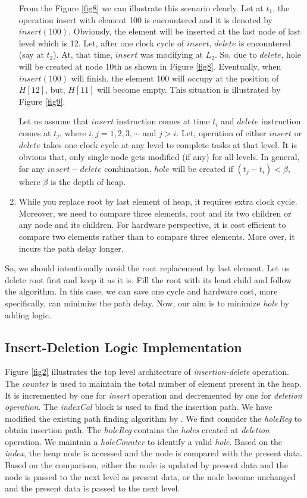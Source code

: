 \documentclass[10pt, conference, compsocconf]{IEEEtran}
\begin{document}
\begin{enumerate}
From the Figure \ref{fig8} we can illustrate this scenario clearly. Let at $t_1$, the operation insert with element 100 is encountered and it is denoted by $insert(100)$. Obviously, the element will be inserted at the last node of last level which is 12. Let, after one clock cycle of $insert$, $delete$ is encountered (say at $t_2$). At, that time, $insert$ was modifying at $L_2$. So, due to $delete$, hole will be created at node 10th as shown in Figure \ref{fig8}. Eventually, when $insert(100)$ will finish, the element 100 will occupy at the position of $H[12]$, but, $H[11]$ will become empty. This situation is illustrated by Figure \ref{fig9}.

Let us assume that $insert$ instruction comes at time $t_i$ and $delete$ instruction comes at $t_j$, where $i, j = 1,2,3, \cdots$ and $j>i$.  Let, operation of either $insert$ or $delete$ takes one clock cycle at any level to complete tasks at that level. It is obvious that, only single node gets modified (if any) for all levels. In general, for any $insert-delete$ combination, $hole$ will be created if $(t_j - t_i) < \beta$, where $\beta$ is the depth of heap.

\item While you replace root by last element of heap, it requires extra clock cycle. Moreover, we need to compare three elements, root and its two children or any node and its children. For hardware perspective, it is cost efficient to compare two elements rather than to compare three elements. More over, it incurs the path delay longer.

\end{enumerate}

So, we should intentionally avoid the root replacement by last element. Let us delete root first and keep it as it is. Fill the root with its least child and follow the algorithm. In this case, we can save one cycle and hardware cost, more specifically, can minimize the path delay. Now, our aim is to minimize {\it hole} by adding logic.

\subsection{Insert-Deletion Logic Implementation}

Figure \ref{fig2} illustrates the top level architecture of {\it insertion-delete} operation. The {\it counter} is used to maintain the total number of element present in the heap. It is incremented by one for {\it insert} operation and decremented by one for {\it deletion operation}. The {\it indexCal} block is used to find the insertion path. We have modified the existing path finding algorithm by \cite{pq6}. We first consider the {\it holeReg} to obtain insertion path. The {\it holeReg} contains the {\it holes} created at {\it deletion} operation. We maintain a {\it holeCounter} to identify a valid {\it hole}. Based on the {\it index}, the heap node is accessed and the node is compared with the present data. Based on the comparison, either the node is updated by present data and the node is passed to the next level as present data, or the node become unchanged and the present data is passed to the next level.
\end{document}

